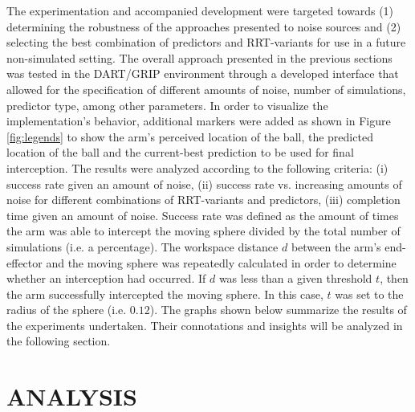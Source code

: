 \documentclass[letterpaper, 10 pt, conference]{ieeeconf}  %
\begin{document}
The experimentation and accompanied development were targeted towards
(1) determining the robustness of the approaches presented to noise
sources and (2) selecting the best combination of predictors and
RRT-variants for use in a future non-simulated setting. The overall
approach presented in the previous sections was tested in the DART/GRIP
environment through a developed interface that allowed for the
specification of different amounts of noise, number of simulations,
predictor type, among other parameters. In order to visualize the
implementation's behavior, additional markers were added as shown in
Figure \ref{fig:legends} to show the arm's perceived location of the
ball, the predicted location of the ball and the current-best prediction
to be used for final interception. The results were analyzed according
to the following criteria: (i) success rate given an amount of noise,
(ii) success rate vs. increasing amounts of noise for different
combinations of RRT-variants and predictors, (iii) completion time given
an amount of noise.  Success rate was defined as the amount of times the
arm was able to intercept the moving sphere divided by the total number
of simulations (i.e. a percentage). The workspace distance $d$ between
the arm's end-effector and the moving sphere was repeatedly calculated
in order to determine whether an interception had occurred. If $d$ was
less than a given threshold $t$, then the arm successfully intercepted
the moving sphere. In this case, $t$ was set to the radius of the sphere
(i.e. $0.12$).  The graphs shown below summarize the results of the
experiments undertaken. Their connotations and insights will be analyzed
in the following section.

\section{ANALYSIS}
\end{document}
